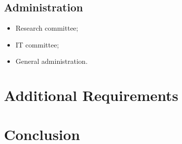 \documentclass{article}
\begin{document}
\subsection{Administration}

\begin{itemize}
    \item Research committee;
    \item IT committee;
    \item General administration.
\end{itemize}

\section{Additional Requirements}\label{sec:additional}
\section{Conclusion}\label{sec:conclusion}

\newpage


\end{document}
